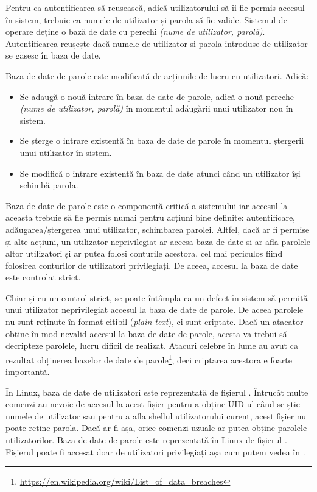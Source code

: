 Pentru ca autentificarea să reușească, adică utilizatorului să îi fie permis accesul în sistem, trebuie ca numele de utilizator și parola să fie valide.
Sistemul de operare deține o bază de date cu perechi \textit{(nume de utilizator, parolă)}.
Autentificarea reușește dacă numele de utilizator și parola introduse de utilizator se găsesc în baza de date.

Baza de date de parole este modificată de acțiunile de lucru cu utilizatori.
Adică:

\begin{itemize}
  \item Se adaugă o nouă intrare în baza de date de parole, adică o nouă pereche \textit{(nume de utilizator, parolă)} în momentul adăugării unui utilizator nou în sistem.
  \item Se șterge o intrare existentă în baza de date de parole în momentul ștergerii unui utilizator în sistem.
  \item Se modifică o intrare existentă în baza de date atunci când un utilizator își schimbă parola.
\end{itemize}

Baza de date de parole este o componentă critică a sistemului iar accesul la aceasta trebuie să fie permis numai pentru acțiuni bine definite: autentificare, adăugarea/ștergerea unui utilizator, schimbarea parolei.
Altfel, dacă ar fi permise și alte acțiuni, un utilizator neprivilegiat ar accesa baza de date și ar afla parolele altor utilizatori și ar putea folosi conturile acestora, cel mai periculos fiind folosirea conturilor de utilizatori privilegiați.
De aceea, accesul la baza de date este controlat strict.

Chiar și cu un control strict, se poate întâmpla ca un defect în sistem să permită unui utilizator neprivilegiat accesul la baza de date de parole.
De aceea parolele nu sunt reținute în format citibil (\textit{plain text}), ci sunt criptate.
Dacă un atacator obține în mod nevalid accesul la baza de date de parole, acesta va trebui să decripteze parolele, lucru dificil de realizat.
Atacuri celebre în lume au avut ca rezultat obținerea bazelor de date de parole\footnote{\url{https://en.wikipedia.org/wiki/List\_of\_data\_breaches}}, deci criptarea acestora e foarte importantă.

În Linux, baza de date de utilizatori este reprezentată de fișierul .
Întrucât multe comenzi au nevoie de accesul la acest fișier pentru a obține UID-ul când se știe numele de utilizator sau pentru a afla shellul utilizatorului curent, acest fișier nu poate reține parola.
Dacă ar fi așa, orice comenzi uzuale ar putea obține parolele utilizatorilor.
Baza de date de parole este reprezentată în Linux de fișierul .
Fișierul  poate fi accesat doar de utilizatori privilegiați așa cum putem vedea în .

